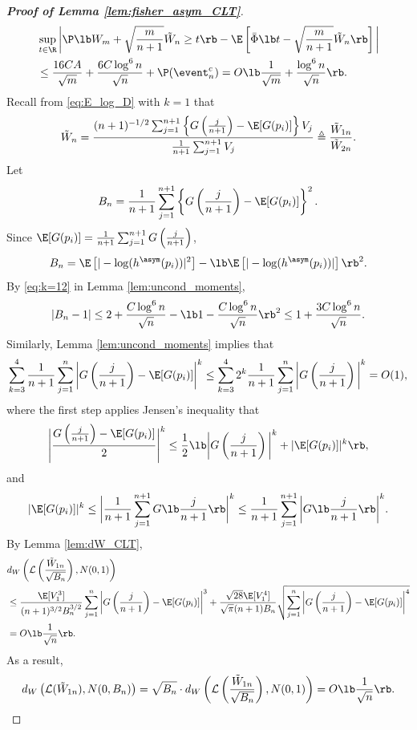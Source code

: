 \begin{proof}[\textbf{Proof of Lemma \ref{lem:fisher_asym_CLT}}]
\begin{align}
  &\sup_{t\in \R}\bigg|\P\lb W_{m} + \sqrt{\frac{m}{n+1}}\tilde{W}_{n}\ge t \rb - \E\left[\bar{\Phi}\lb t - \sqrt{\frac{m}{n+1}}\tilde{W}_{n}\rb\right]\bigg|\nonumber\\
  & \le \frac{16CA}{\sqrt{m}} + \frac{6C\log^6 n}{\sqrt{n}} + \P(\event_n^c)
    = O\lb \frac{1}{\sqrt{m}} + \frac{\log^6 n}{\sqrt{n}}\rb.
    \label{eq:P_Wm_Wn}
\end{align}
Recall from \eqref{eq:E_log_D} with $k = 1$ that
\[\tilde{W}_{n} = \frac{(n + 1)^{-1/2}\sum_{j=1}^{n+1}\left\{G\left(\frac{j}{n+1}\right) - \E[G(p_i)]\right\}V_{j}}{\frac{1}{n+1}\sum_{j=1}^{n+1}V_{j}}\triangleq \frac{\tilde{W}_{1n}}{\tilde{W}_{2n}}.\]
Let
\[B_{n} = \frac{1}{n+1}\sum_{j=1}^{n+1}\left\{G\left(\frac{j}{n+1}\right) - \E[G(p_i)]\right\}^2.\]
Since $\E[G(p_i)] = \frac{1}{n+1}\sum_{j=1}^{n+1}G\left(\frac{j}{n+1}\right)$,
\[B_{n} = \E\left[|-\log (h^\asym(p_i))|^2\right] - \lb\E\left[|-\log (h^\asym(p_i))|\right]\rb^2.\]
By \eqref{eq:k=12} in Lemma \ref{lem:uncond_moments},
\begin{equation*}
    |B_{n} - 1| \le 2 + \frac{C\log^6 n}{\sqrt{n}} - \lb 1 - \frac{C\log^6 n}{\sqrt{n}}\rb^2\le 1 + \frac{3C\log^6 n}{\sqrt{n}}.
\end{equation*}
Similarly, Lemma \ref{lem:uncond_moments} implies that
\[\sum_{k=3}^{4}\frac{1}{n+1}\sum_{j=1}^{n}\bigg|G\left(\frac{j}{n+1}\right) - \E[G(p_i)]\bigg|^k \le \sum_{k=3}^{4}2^{k}\frac{1}{n+1}\sum_{j=1}^{n}\bigg|G\left(\frac{j}{n+1}\right)\bigg|^k = O(1),\]
where the first step applies Jensen's inequality that
\[\Bigg|\frac{G\left(\frac{j}{n+1}\right) - \E[G(p_i)]}{2}\Bigg|^k\le \frac{1}{2}\lb\bigg|G\left(\frac{j}{n+1}\right)\bigg|^{k} + |\E[G(p_i)]|^k\rb,\]
and
\[|\E[G(p_i)]|^k\le \bigg|\frac{1}{n+1}\sum_{j=1}^{n+1}G\lb\frac{j}{n+1}\rb\bigg|^{k}\le \frac{1}{n+1}\sum_{j=1}^{n+1}\bigg|G\lb\frac{j}{n+1}\rb\bigg|^{k}.\]
By Lemma \ref{lem:dW_CLT},
\begin{align*}
  & d_{W}\left(\mathcal{L}\left(\frac{\tilde{W}_{1n}}{\sqrt{B_n}}\right), N(0, 1)\right)\\
  & \le \frac{\E[V_1^3]}{(n+1)^{3/2}B_n^{3/2}}\sum_{j=1}^{n}\bigg|G\left(\frac{j}{n+1}\right) - \E[G(p_i)]\bigg|^3 + \frac{\sqrt{28}\E[V_1^4]}{\sqrt{\pi}(n+1) B_n}\sqrt{\sum_{j=1}^{n}\bigg|G\left(\frac{j}{n+1}\right) - \E[G(p_i)]\bigg|^4}\\
  & = O\lb\frac{1}{\sqrt{n}}\rb.
\end{align*}
As a result,
\[d_{W}\left(\mathcal{L}(\tilde{W}_{1n}), N(0, B_n)\right) = \sqrt{B_n}\cdot d_{W}\left(\mathcal{L}\left(\frac{\tilde{W}_{1n}}{\sqrt{B_n}}\right), N(0, 1)\right) = O\lb\frac{1}{\sqrt{n}}\rb.\]

\end{proof}
